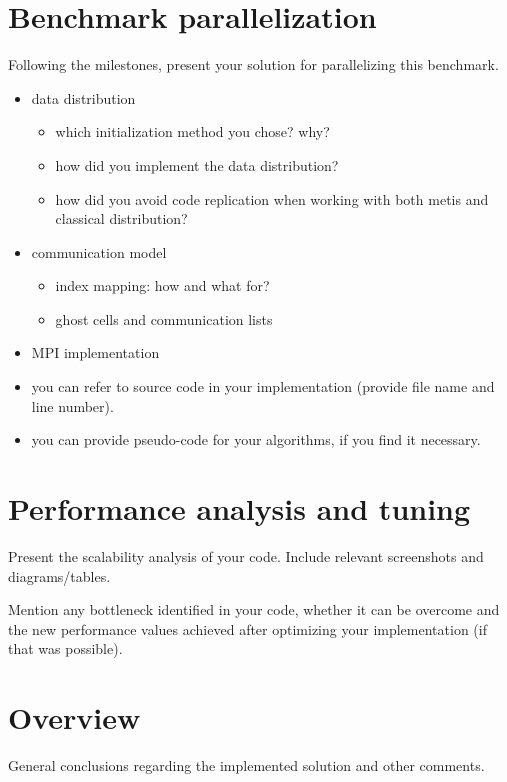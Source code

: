 \documentclass[12pt, a4paper]{article}
\newcommand{\draft}[1]{\textcolor{NavyBlue}{#1}}
\newcommand{\hint}[1]{\textcolor{OliveGreen}{{\it#1}}}
\begin{document}
\section{Benchmark parallelization}
\draft{Following the milestones, present your solution for parallelizing this benchmark.
\begin{itemize}
	\item data distribution
	\begin{itemize}
		\item which initialization method you chose? why?
		\item how did you implement the data distribution?
		\item how did you avoid code replication when working with both metis and classical distribution?
	\end{itemize}
	\item communication model
	\begin{itemize}
		\item index mapping: how and what for?
		\item ghost cells and communication lists
	\end{itemize}
	\item MPI implementation
\end{itemize}
}
\hint{\begin{itemize}
	\item you can refer to source code in your implementation (provide file name and line number).
	\item you can provide pseudo-code for your algorithms, if you find it necessary.
\end{itemize}}

\section{Performance analysis and tuning}
\draft{
Present the scalability analysis of your code. Include relevant screenshots and diagrams/tables.}

\draft{
Mention any bottleneck identified in your code, whether it can be overcome and the new performance values achieved after optimizing your implementation (if that was possible).
}

\section{Overview}
\draft{
General conclusions regarding the implemented solution and other comments.
}
\end{document}

